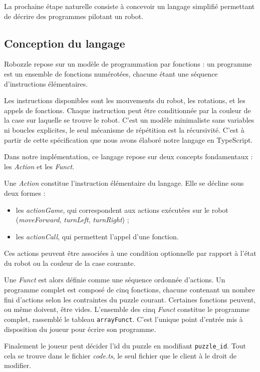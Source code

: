 La prochaine étape naturelle consiste à concevoir un langage simplifié permettant de décrire des programmes pilotant un robot. 

\subsection{Conception du langage}

Robozzle repose sur un modèle de programmation par fonctions : un programme est un ensemble de fonctions numérotées, chacune étant une séquence d'instructions élémentaires. 

Les instructions disponibles sont les mouvements du robot, les rotations, et les appels de fonctions. Chaque instruction peut être conditionnée par la couleur de la case sur laquelle se trouve le robot. C’est un modèle minimaliste sans variables ni boucles explicites, le seul mécanisme de répétition est la récursivité. C'est à partir de cette spécification que nous avons élaboré notre langage en TypeScript.

Dans notre implémentation, ce langage repose sur deux concepts fondamentaux : les \textit{Action} et les \textit{Funct}.

Une \textit{Action} constitue l’instruction élémentaire du langage. Elle se décline sous deux formes :
\begin{itemize}
    \item les \textit{actionGame}, qui correspondent aux actions exécutées sur le robot (\textit{moveForward}, \textit{turnLeft}, \textit{turnRight}) ;
    \item les \textit{actionCall}, qui permettent l’appel d’une fonction.
\end{itemize}

Ces actions peuvent être associées à une condition optionnelle par rapport à l’état du robot ou la couleur de la case courante. 

Une \textit{Funct} est alors définie comme une séquence ordonnée d’actions. Un programme complet est composé de cinq fonctions, chacune contenant un nombre fini d’actions selon les contraintes du puzzle courant. Certaines fonctions peuvent, ou même doivent, être vides. L'ensemble des cinq \textit{Funct} constitue le programme complet, rassemblé le tableau \texttt{arrayFunct}. C'est l'unique point d'entrée mis à disposition du joueur pour écrire son programme.

Finalement le joueur peut décider l’id du puzzle en modifiant \texttt{puzzle\_id}. Tout cela se trouve dans le fichier \textit{code.ts}, le seul fichier que le client à le droit de modifier.

